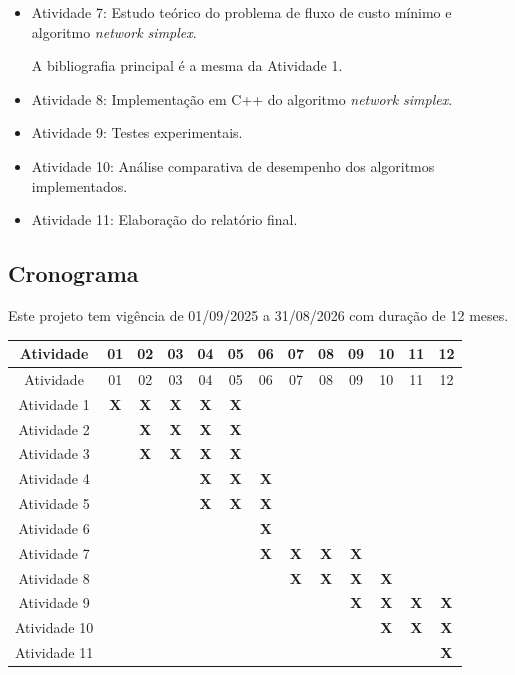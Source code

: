 \documentclass{amsart}
\begin{document}
\begin{itemize}
    \item Atividade 7: Estudo teórico do problema de fluxo de custo mínimo e algoritmo \textit{network simplex}.

    A bibliografia principal é a mesma da Atividade 1.

    \item Atividade 8: Implementação em C++ do algoritmo \textit{network simplex}.

    \item Atividade 9: Testes experimentais.

    \item Atividade 10: Análise comparativa de desempenho dos algoritmos implementados.

    \item Atividade 11: Elaboração do relatório final.
\end{itemize}

\subsection{Cronograma}

Este projeto tem vigência de 01/09/2025 a 31/08/2026 com duração de 12 meses.

\begin{longtable}{ |c|c|c|c|c|c|c|c|c|c|c|c|c|}
\hline
Atividade   &01&02&03&04&05&06&07&08&09&10&11&12\\ \hline
\endfirsthead

\hline
Atividade   &01&02&03&04&05&06&07&08&09&10&11&12\\ \hline
\endhead

Atividade 1 &\textbf{\textsf{X}}&\textbf{\textsf{X}}&\textbf{\textsf{X}}&\textbf{\textsf{X}}&\textbf{\textsf{X}}&&&&&&&\\ \hline
Atividade 2 &&\textbf{\textsf{X}}&\textbf{\textsf{X}}&\textbf{\textsf{X}}&\textbf{\textsf{X}}&&&&&&&\\ \hline
Atividade 3 &&\textbf{\textsf{X}}&\textbf{\textsf{X}}&\textbf{\textsf{X}}&\textbf{\textsf{X}}&&&&&&&\\ \hline
Atividade 4 &&&&\textbf{\textsf{X}}&\textbf{\textsf{X}}&\textbf{\textsf{X}}&&&&&&\\ \hline
Atividade 5 &&&&\textbf{\textsf{X}}&\textbf{\textsf{X}}&\textbf{\textsf{X}}&&&&&&\\ \hline
Atividade 6 &&&&&&\textbf{\textsf{X}}&&&&&&\\ \hline
Atividade 7 &&&&&&\textbf{\textsf{X}}&\textbf{\textsf{X}}&\textbf{\textsf{X}}&\textbf{\textsf{X}}&&&\\ \hline
Atividade 8 &&&&&&&\textbf{\textsf{X}}&\textbf{\textsf{X}}&\textbf{\textsf{X}}&\textbf{\textsf{X}}&&\\ \hline
Atividade 9 &&&&&&&&&\textbf{\textsf{X}}&\textbf{\textsf{X}}&\textbf{\textsf{X}}&\textbf{\textsf{X}}\\ \hline
Atividade 10 &&&&&&&&&&\textbf{\textsf{X}}&\textbf{\textsf{X}}&\textbf{\textsf{X}}\\ \hline
Atividade 11 &&&&&&&&&&&&\textbf{\textsf{X}}\\ \hline
\end{longtable}
\end{document}
